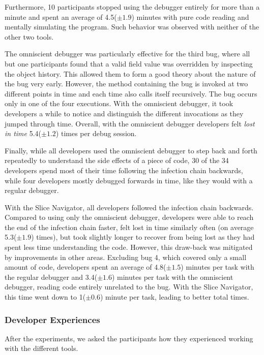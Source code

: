 \documentclass[
			english,
			review,
			]{elsarticle}
\begin{document}
Furthermore, 10 participants stopped using the debugger entirely for more than a minute and spent an average of 4.5($\pm1.9$) minutes with pure code reading and mentally simulating the program.
Such behavior was observed with neither of the other two tools.

The omniscient debugger was particularly effective for the third bug, where all but one participants found that a valid field value was overridden by inspecting the object history.
This allowed them to form a good theory about the nature of the bug very early.
However, the method containing the bug is invoked at two different points in time and each time also calls itself recursively.
The bug occurs only in one of the four executions.
With the omniscient debugger, it took developers a while to notice and distinguish the different invocations as they jumped through time.
Overall, with the omniscient debugger developers felt \emph{lost in time} 5.4($\pm1.2$) times per debug session.

Finally, while all developers used the omniscient debugger to step back and forth repeatedly to understand the side effects of a piece of code, 30 of the 34 developers spend most of their time following the infection chain backwards, while four developers mostly debugged forwards in time, like they would with a regular debugger.

With the Slice Navigator, all developers followed the infection chain backwards.
Compared to using only the omniscient debugger, developers were able to reach the end of the infection chain faster, felt lost in time similarly often (on average 5.3($\pm1.9$) times), but took slightly longer to recover from being lost as they had spent less time understanding the code.
However, this draw-back was mitigated by improvements in other areas.
Excluding bug 4, which covered only a small amount of code, developers spent an average of 4.8($\pm1.5$) minutes per task with the regular debugger and 3.4($\pm1.6$) minutes per task with the omniscient debugger, reading code entirely unrelated to the bug.
With the Slice Navigator, this time went down to 1($\pm0.6$) minute per task, leading to better total times.

\subsubsection{Developer Experiences}

After the experiments, we asked the participants how they experienced working with the different tools.
\end{document}

